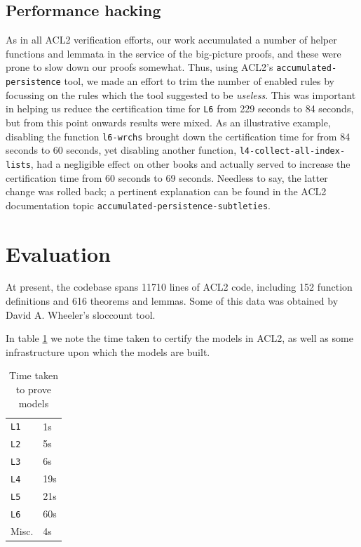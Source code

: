 \documentclass[runningheads,a4paper]{llncs}
\begin{document}
\subsection{Performance hacking}

As in all ACL2 verification efforts, our work accumulated a number of
helper functions and lemmata in the service of the big-picture proofs,
and these were prone to slow down our proofs somewhat. Thus, using
ACL2's \texttt{accumulated-persistence} tool, we made an effort to
trim the number of enabled rules by focussing on the rules which the
tool suggested to be \textit{useless}. This was important in helping us reduce
the certification time for \texttt{L6} from 229 seconds to 84 seconds,
but from this point onwards results were mixed. As an illustrative
example, disabling the function \texttt{l6-wrchs} brought down the
certification time for  from 84 seconds to 60 seconds, yet
disabling another function, \texttt{l4-collect-all-index-lists}, had a
negligible effect on other books and actually served to increase the
certification time from 60 seconds to 69 seconds. Needless to say, the
latter change was rolled back; a pertinent explanation can be found in
the ACL2 documentation topic \texttt{accumulated-persistence-subtleties}.


\section{Evaluation}
At present, the codebase spans 11710 lines of ACL2 code, including 152
function definitions and 616 theorems and lemmas. Some of this data was
obtained by David A. Wheeler's sloccount tool.

In table \ref{certification-timing-table} we note the time taken to certify
the models in ACL2, as well as some infrastructure upon which the
models are built.

\begin{table}[]
  \centering
  \caption{Time taken to prove models}
  \label{certification-timing-table}
  \begin{tabular}{ll}
    \texttt{L1} & 1s \\
    \texttt{L2} & 5s \\
    \texttt{L3} & 6s \\
    \texttt{L4} & 19s \\
    \texttt{L5} & 21s \\
    \texttt{L6} & 60s \\
    Misc. & 4s \\
  \end{tabular}
\end{table}
\end{document}

